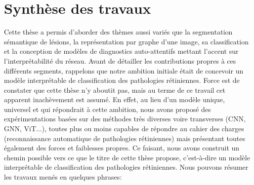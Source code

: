 \label{sec:Conclusion}



\section{Synthèse des travaux}
Cette thèse a permis d'aborder des thèmes aussi variés que la segmentation sémantique de lésions, la représentation par graphe d'une image, sa classification et la conception de modèles de diagnostics auto-attentifs mettant l'accent sur l'interprétabilité du réseau. Avant de détailler les contributions propres à ces différents segments, rappelons que notre ambition initiale était de concevoir un modèle interprétable de classification des pathologies rétiniennes. Force est de constater que cette thèse n'y aboutit pas, mais au terme de ce travail cet apparent inachèvement est assumé. En effet, au lieu d'un modèle unique, universel et qui répondrait à cette ambition, nous avons proposé des expérimentations basées sur des méthodes très diverses voire transverses (CNN, GNN, ViT...), toutes plus ou moins capables de répondre au cahier des charges (reconnaissance automatique de pathologies rétiniennes) mais présentant toutes également des forces et faiblesses propres. Ce faisant, nous avons construit un chemin possible vers ce que le titre de cette thèse propose, c'est-à-dire un modèle interprétable de classification des  pathologies rétiniennes. Nous pouvons résumer les travaux menés en quelques phrases:
